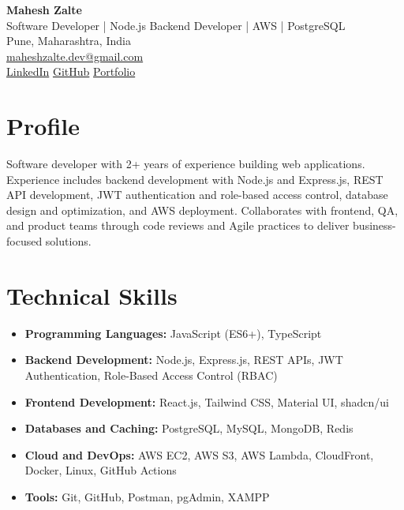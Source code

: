 \documentclass[a4paper,10pt]{article}
\begin{document}
\begin{center}
  {\LARGE\textbf{Mahesh Zalte}}\\[4pt]
  {\large Software Developer | Node.js Backend Developer | AWS | PostgreSQL}\\[4pt]
  Pune, Maharashtra, India\\
  \href{mailto:maheshzalte.dev@gmail.com}{maheshzalte.dev@gmail.com}\\
  \href{https://linkedin.com/in/maheshzalte2000}{LinkedIn} \quad
  \href{https://github.com/zaltemahesh7}{GitHub} \quad
  \href{https://maheshzalte.netlify.app}{Portfolio}
\end{center}

\section*{Profile}
Software developer with 2+ years of experience building web applications. Experience includes backend development with Node.js and Express.js, REST API development, JWT authentication and role-based access control, database design and optimization, and AWS deployment. Collaborates with frontend, QA, and product teams through code reviews and Agile practices to deliver business-focused solutions.

\section*{Technical Skills}
\begin{itemize}
  \item \textbf{Programming Languages:} JavaScript (ES6+), TypeScript
  \item \textbf{Backend Development:} Node.js, Express.js, REST APIs, JWT Authentication, Role-Based Access Control (RBAC)
  \item \textbf{Frontend Development:} React.js, Tailwind CSS, Material UI, shadcn/ui
  \item \textbf{Databases and Caching:} PostgreSQL, MySQL, MongoDB, Redis
  \item \textbf{Cloud and DevOps:} AWS EC2, AWS S3, AWS Lambda, CloudFront, Docker, Linux, GitHub Actions
  \item \textbf{Tools:} Git, GitHub, Postman, pgAdmin, XAMPP
\end{itemize}
\end{document}
